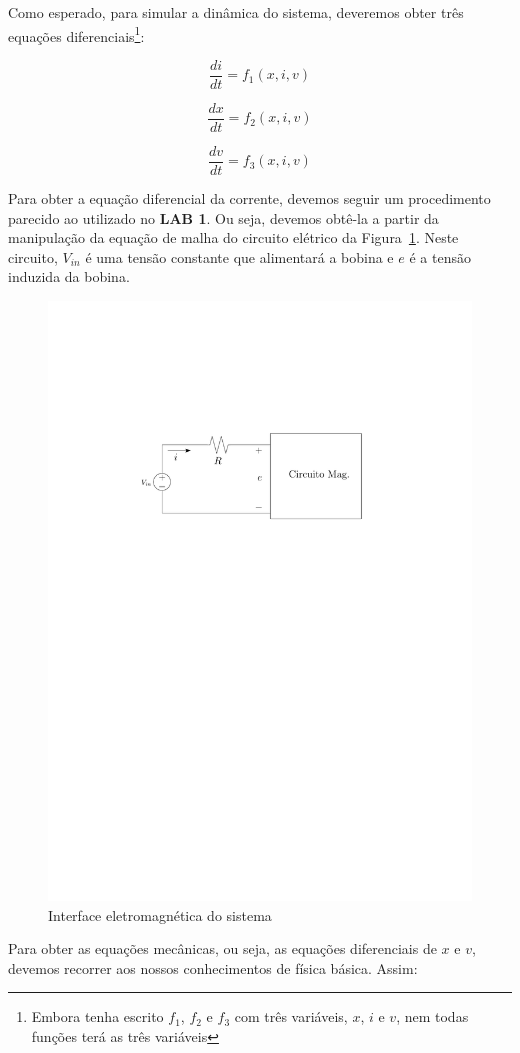 \documentclass[a4paper]{article}
\theoremstyle{definition}
\theoremstyle{plain}
\begin{document}
Como esperado, para simular a dinâmica do sistema, deveremos obter três equações diferenciais\footnote{Embora tenha escrito $f_1$, $f_2$ e $f_3$ com três variáveis, $x$, $i$ e $v$, nem todas funções terá as três variáveis}:

\begin{equation}
\frac{d i}{dt} = f_1 (x,i,v)
\end{equation}

\begin{equation}
\frac{d x}{dt} = f_2 (x,i,v)
\end{equation}

\begin{equation}
\frac{d v}{dt} = f_3 (x,i,v)
\end{equation}



Para obter a equação diferencial da corrente, devemos seguir um procedimento parecido ao utilizado no \textbf{LAB 1}. Ou seja, devemos obtê-la a partir da manipulação da equação de malha do circuito elétrico da Figura~\ref{fig:mag}. Neste circuito, $V_{in}$ é uma tensão constante que alimentará a bobina e $e$ é a tensão induzida da bobina.


\begin{figure}[!htb]
\centering
\includegraphics[width=0.50\linewidth]{./figuras/circuito_bobina}
\caption{Interface eletromagnética do sistema}
\label{fig:mag}
\end{figure}


Para obter as equações mecânicas, ou seja, as equações diferenciais de $x$ e $v$, devemos recorrer aos nossos conhecimentos de física básica. Assim:
\end{document}
